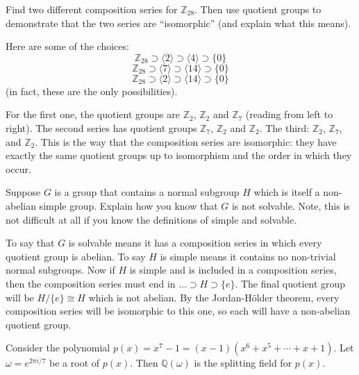 \documentclass[11pt]{exam}
\def\Z{\mathbb{Z}}
\def\Q{\mathbb{Q}}
\DeclareMathOperator{\Gal}{Gal}
\begin{document}
\begin{questions}
\begin{parts}
\end{parts}


\question[6] Find two different composition series for $\Z_{28}$.  Then use quotient groups to demonstrate that the two series are ``isomorphic'' (and explain what this means).

\begin{solution}
Here are some of the choices:
\[\Z_{28} \supset \langle 2\rangle \supset \langle 4 \rangle \supset \{0\}\]
\[\Z_{28} \supset \langle 7\rangle \supset \langle 14\rangle \supset \{0\}\]
\[\Z_{28} \supset \langle 2 \rangle \supset \langle 14 \rangle \supset \{0\}\]
(in fact, these are the only possibilities).

For the first one, the quotient groups are $\Z_2$, $\Z_2$ and $\Z_7$ (reading from left to right).  The second series has quotient groups $\Z_7$, $\Z_2$ and $\Z_2$.  The third: $\Z_2$, $\Z_7$, and $\Z_2$.  This is the way that the composition series are isomorphic: they have exactly the same quotient groups up to isomorphism and the order in which they occur.
\end{solution}



\question[4] Suppose $G$ is a group that contains a normal subgroup $H$ which is itself a non-abelian simple group.  Explain how you know that $G$ is not solvable.  Note, this is not difficult at all if you know the definitions of simple and solvable.

\begin{solution}
To say that $G$ is solvable means it has a composition series in which every quotient group is abelian.  To say $H$ is simple means it contains no non-trivial normal subgroups.  Now if $H$ is simple and is included in a composition series, then the composition series must end in $\ldots \supset H \supset \{e\}$.  The final quotient group will be $H/\{e\}\cong H$ which is not abelian.  By the Jordan-H\"older theorem, every composition series will be isomorphic to this one, so each will have a non-abelian quotient group.
\end{solution}


\question[6] Consider the polynomial $p(x) = x^7 - 1 = (x-1)(x^6+x^5+\cdots+x+1)$.  Let $\omega = e^{2\pi i/7}$ be a root of $p(x)$.  Then $\Q(\omega)$ is the splitting field for $p(x)$.
\end{questions}
\end{document}
